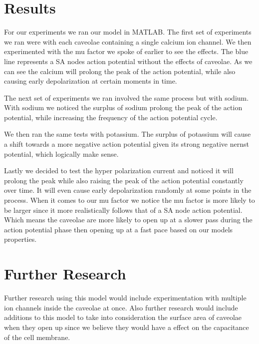 \documentclass{bmcart}%
\begin{document}
\section*{Results}

For our experiments we ran our model in MATLAB. The first set of experiments we ran were with each caveolae containing a single calcium ion channel. We then experimented with the mu factor we spoke of earlier to see the effects. The blue line represents a SA nodes action potential without the effects of caveolae.
As we can see the calcium will prolong the peak of the action potential, while also causing early depolarization at certain moments in time.

The next set of experiments we ran involved the same process but with sodium. With sodium we noticed the surplus of sodium prolong the peak of the action potential, while increasing the frequency of the action potential cycle. 

We then ran the same tests with potassium. The surplus of potassium will cause a shift towards a more negative action potential given its strong negative nernst potential, which logically make sense. 

Lastly we decided to test the hyper polarization current and noticed it will prolong the peak while also raising the peak of the action potential constantly over time. It will even cause early depolarization randomly at some points in the process. When it comes to our mu factor we notice the mu factor is more likely to be larger since it more realistically follows that of a SA node action potential. Which means the caveolae are more likely to open up at a slower pass during the action potential phase then opening up at a fast pace based on our models properties.

\section*{Further Research}

 Further research using this model would include experimentation with multiple ion channels inside the caveolae at once. Also further research would include additions to this model to take into consideration the surface area of caveolae when they open up since we believe they would have a effect on the capacitance of the cell membrane. 

\end{document}

